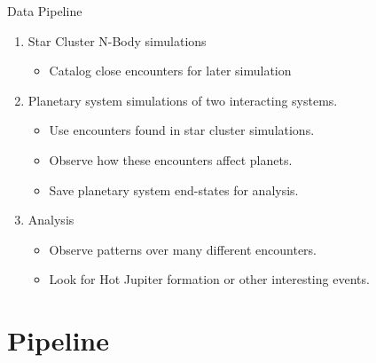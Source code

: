 \documentclass{beamer}
\begin{document}
\begin{frame}{Data Pipeline}
    \begin{enumerate}
        \item Star Cluster N-Body simulations
            \begin{itemize}
                \item Catalog close encounters for later simulation
            \end{itemize}
        \item Planetary system simulations of two interacting systems.
            \begin{itemize}
                \item Use encounters found in star cluster simulations.
                \item Observe how these encounters affect planets.
                \item Save planetary system end-states for analysis.
            \end{itemize}
        \item Analysis 
            \begin{itemize}
                \item Observe patterns over many different encounters.
                \item Look for Hot Jupiter formation or other interesting events.
            \end{itemize}
    \end{enumerate}
\end{frame}

\section{Pipeline}
\end{document}
